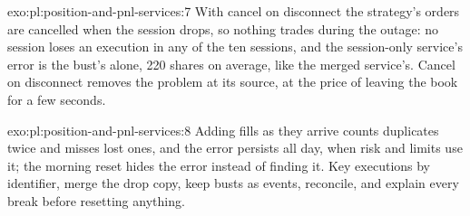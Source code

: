 \begin{solution}{exo:pl:position-and-pnl-services:7}
With cancel on disconnect the strategy's orders are cancelled when the session drops, so nothing trades during the outage: no session loses an
execution in any of the ten sessions, and the session-only service's error is the bust's alone, 220 shares on average, like the merged
service's. Cancel on disconnect removes the problem at its source, at the price of leaving the book for a few seconds.
\end{solution}

\begin{solution}{exo:pl:position-and-pnl-services:8}
Adding fills as they arrive counts duplicates twice and misses lost ones, and the error persists all day, when risk and limits use it; the
morning reset hides the error instead of finding it. Key executions by identifier, merge the drop copy, keep busts as events, reconcile, and
explain every break before resetting anything.
\end{solution}

